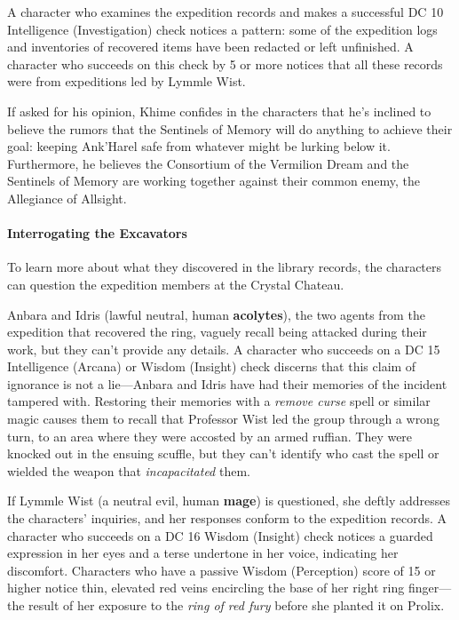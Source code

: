 \documentclass[letterpaper, 11pt, bg=full, twocolumn]{dndbook}
\begin{document}
A character who examines the expedition records and makes a successful DC 10 Intelligence (Investigation) check notices a pattern: some of the expedition logs and inventories of recovered items have been redacted or left unfinished. A character who succeeds on this check by 5 or more notices that all these records were from expeditions led by Lymmle Wist.

If asked for his opinion, Khime confides in the characters that he's inclined to believe the rumors that the Sentinels of Memory will do anything to achieve their goal: keeping Ank'Harel safe from whatever might be lurking below it. Furthermore, he believes the Consortium of the Vermilion Dream and the Sentinels of Memory are working together against their common enemy, the Allegiance of Allsight.

\paragraph{Interrogating the Excavators}

To learn more about what they discovered in the library records, the characters can question the expedition members at the Crystal Chateau.

Anbara and Idris (lawful neutral, human \textbf{acolytes}), the two agents from the expedition that recovered the ring, vaguely recall being attacked during their work, but they can't provide any details. A character who succeeds on a DC 15 Intelligence (Arcana) or Wisdom (Insight) check discerns that this claim of ignorance is not a lie---Anbara and Idris have had their memories of the incident tampered with. Restoring their memories with a \textit{remove curse} spell or similar magic causes them to recall that Professor Wist led the group through a wrong turn, to an area where they were accosted by an armed ruffian. They were knocked out in the ensuing scuffle, but they can't identify who cast the spell or wielded the weapon that \textit{incapacitated} them.

If Lymmle Wist (a neutral evil, human \textbf{mage}) is questioned, she deftly addresses the characters' inquiries, and her responses conform to the expedition records. A character who succeeds on a DC 16 Wisdom (Insight) check notices a guarded expression in her eyes and a terse undertone in her voice, indicating her discomfort. Characters who have a passive Wisdom (Perception) score of 15 or higher notice thin, elevated red veins encircling the base of her right ring finger---the result of her exposure to the \textit{ring of red fury} before she planted it on Prolix.
\end{document}
